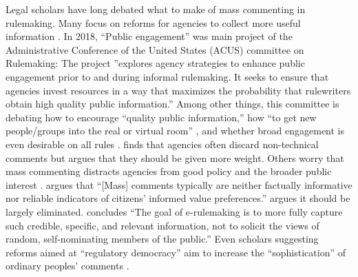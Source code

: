 










Legal scholars have long debated what to make of mass commenting in rulemaking. Many focus on reforms for agencies to collect more useful information \citep{Farina2011, Farina2014, Rauch2016}. In 2018, ``Public engagement'' was main project of the Administrative Conference of the United States (ACUS) committee on Rulemaking: %
{The project} ''explores agency strategies to enhance public engagement prior to and during informal rulemaking. It seeks to ensure that agencies invest resources in a way that maximizes the probability that rulewriters obtain high quality public information.''  Among other things, this committee is debating how to encourage ``quality public information,'' how ``to get new people/groups into the real or virtual room'' \citep{Farina2018}, and whether broad engagement is even desirable on all rules \citep{White2018}. \citet{Mendelson2011} finds that agencies often discard non-technical comments but argues that they should be given more weight. Others worry that mass commenting distracts agencies from good policy and the broader public interest \citep{Coglianese2006}. \citet[p. 112]{Farina2012} argues that ``[Mass] comments typically are neither factually informative nor reliable indicators of citizens’ informed value preferences.'' \citet{Rossi1997} argues it should be largely eliminated. \citet[p. 208]{Herz2016} concludes ``The goal of e-rulemaking is to more fully capture such credible, specific, and relevant information, not to solicit the views of random, self-nominating members of the public.'' 
Even scholars suggesting reforms aimed at ``regulatory democracy'' aim to increase the ``sophistication'' of ordinary peoples' comments \citep{Cuellar2014}. 

